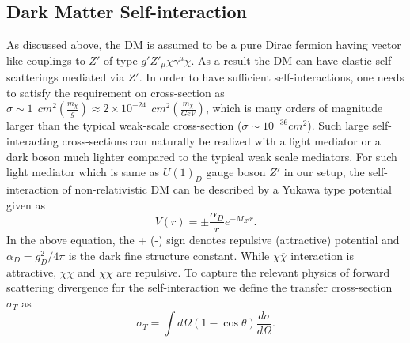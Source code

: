 \documentclass[prd,nofootinbib,preprint,superscriptaddress]{revtex4}
\begin{document}
		
		
		\subsection{Dark Matter Self-interaction}
		\label{self_int}
		As discussed above, the DM is assumed to be a pure Dirac fermion having vector like couplings to $Z'$ of type $g' Z'_{\mu}\overline{\chi}\gamma^\mu\chi$. As a result
		the DM can have elastic self-scatterings mediated via $Z'$. In order to have sufficient self-interactions, one needs to satisfy the requirement on cross-section as $\sigma \sim 1~~cm^2 (\frac{m_\chi}{g}) \approx 2\times 10^{-24}~~cm^2 (\frac{m_\chi}{GeV})$, which is many orders of magnitude larger than the typical weak-scale cross-section ($\sigma \sim 10^{-36} cm^2$). Such large self-interacting cross-sections can naturally be realized with a light mediator or a dark boson much lighter compared to the typical weak scale mediators. For such light mediator which is same as $U(1)_D$ gauge boson $Z'$ in our setup, the self-interaction of non-relativistic DM can be described by a Yukawa type potential given as
		\begin{equation}
			V(r)= \pm \frac{\alpha_D}{r}e^{-M_{Z'}r}.
			\label{eqYuk}
		\end{equation} 
		In the above equation, the + (-) sign denotes repulsive (attractive) potential and $\alpha_D = g^2_D /4\pi$ is the dark fine structure constant. While $\chi \overline{\chi}$ interaction is attractive, $\chi \chi$ and $\overline{\chi} \overline{\chi}$ are repulsive. To capture the relevant physics of forward scattering divergence for the self-interaction we define the transfer cross-section $\sigma_T$ as~\cite{Feng:2009hw,Tulin:2013teo,Tulin:2017ara}
		\begin{equation}
			\sigma_T = \int d\Omega (1-\cos\theta) \frac{d\sigma}{d\Omega}.
		\end{equation}
		
\end{document}

